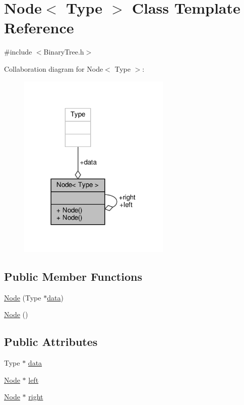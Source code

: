 \hypertarget{class_node}{}\section{Node$<$ Type $>$ Class Template Reference}
\label{class_node}


{\ttfamily \#include $<$Binary\+Tree.\+h$>$}



Collaboration diagram for Node$<$ Type $>$\+:
\nopagebreak
\begin{figure}[H]
\begin{center}
\leavevmode
\includegraphics[width=206pt]{class_node__coll__graph}
\end{center}
\end{figure}
\subsection*{Public Member Functions}
\begin{DoxyCompactItemize}
\item 
\hyperlink{class_node_a238d6ebbae88f5a39daf8f31ff409164}{Node} (Type $\ast$\hyperlink{class_node_a8b322cc3cc17b752eb77533493713ddd}{data})
\item 
\hyperlink{class_node_ab27bbe294970f98f26b5d548dfbb50ca}{Node} ()
\end{DoxyCompactItemize}
\subsection*{Public Attributes}
\begin{DoxyCompactItemize}
\item 
Type $\ast$ \hyperlink{class_node_a8b322cc3cc17b752eb77533493713ddd}{data}
\item 
\hyperlink{class_node}{Node} $\ast$ \hyperlink{class_node_abb08a8b3137dd8fc8874348a439e01b4}{left}
\item 
\hyperlink{class_node}{Node} $\ast$ \hyperlink{class_node_a34452c0684d3cb1590406ad201b43e65}{right}
\end{DoxyCompactItemize}


